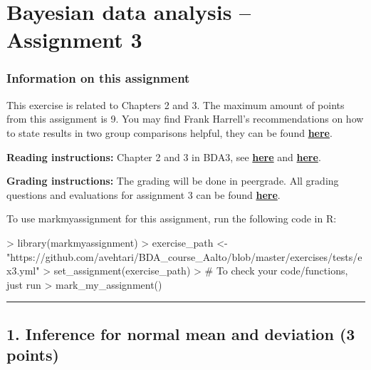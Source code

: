\documentclass[a4paper,11pt]{article}
\newcommand{\HRule}{\rule{\linewidth}{0.5mm}}
\begin{document}

\thispagestyle{empty}

\section*{Bayesian data analysis -- Assignment 3}



\newpage

\subsubsection*{Information on this assignment}

This exercise is related to Chapters 2 and 3. The maximum amount of points from this assignment is 9. You may find Frank Harrell's recommendations on how to state results in two group comparisons helpful, they can be found \href{http://www.fharrell.com/2017/10/bayesian-vs-frequentist-statements.html}{\textbf{here}}.

\textbf{Reading instructions:} Chapter 2 and 3 in BDA3, see \href{https://github.com/avehtari/BDA_course_Aalto/blob/master/chapter_notes/BDA_notes_ch2.pdf}{\textbf{here}} and \href{https://github.com/avehtari/BDA_course_Aalto/blob/master/chapter_notes/BDA_notes_ch3.pdf}{\textbf{here}}.

\textbf{Grading instructions:} The grading will be done in peergrade. All grading questions and evaluations for assignment 3 can be found \href{https://github.com/avehtari/BDA_course_Aalto/blob/master/exercises/ex3_rubric.md}{\textbf{here}}.

To use markmyassignment for this assignment, run the following code in R:
\begin{Schunk}
\begin{Sinput}
> library(markmyassignment)
> exercise_path <- 
    "https://github.com/avehtari/BDA_course_Aalto/blob/master/exercises/tests/ex3.yml"
> set_assignment(exercise_path)
> # To check your code/functions, just run
> mark_my_assignment()
\end{Sinput}
\end{Schunk}

\HRule

\newpage

\subsection*{1. Inference for normal mean and deviation (3 points)}
\end{document}
